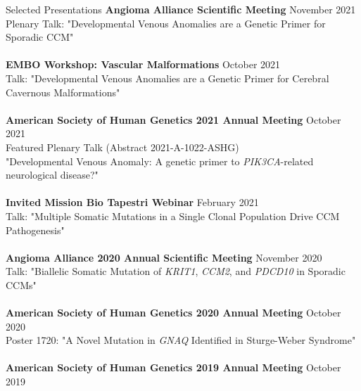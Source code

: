 \documentclass{resume} %
\begin{document}
\begin{rSection}{Selected Presentations}
{\bf Angioma Alliance Scientific Meeting} \hfill {November  2021}\\
Plenary Talk: "Developmental Venous Anomalies are a Genetic Primer for Sporadic CCM"\\\\
{\bf EMBO Workshop: Vascular Malformations} \hfill {October  2021}\\
Talk: "Developmental Venous Anomalies are a Genetic Primer for Cerebral Cavernous Malformations"\\\\
{\bf American Society of Human Genetics 2021 Annual Meeting} \hfill {October  2021}\\
Featured Plenary Talk (Abstract 2021-A-1022-ASHG) \\ "Developmental Venous Anomaly: A genetic primer to \textit{PIK3CA}-related neurological disease?"\\\\
{\bf Invited Mission Bio Tapestri Webinar} \hfill {February  2021}\\
Talk: "Multiple Somatic Mutations in a Single Clonal Population Drive CCM Pathogenesis"\\\\
{\bf Angioma Alliance 2020 Annual Scientific Meeting} \hfill {November 2020}\\
Talk: "Biallelic Somatic Mutation of \textit{KRIT1}, \textit{CCM2}, and \textit{PDCD10} in Sporadic CCMs"\\\\
{\bf American Society of Human Genetics 2020 Annual Meeting} \hfill {October 2020}\\
Poster 1720: "A Novel Mutation in \textit{GNAQ} Identified in Sturge-Weber Syndrome"\\\\
{\bf American Society of Human Genetics 2019 Annual Meeting} \hfill {October 2019}\\

\end{rSection}
\end{document}
